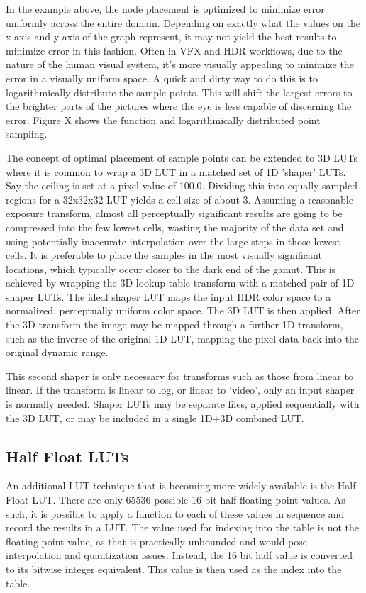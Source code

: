 In the example above, the node placement is optimized to minimize error uniformly across the entire domain. Depending on exactly what the values on the x-axis and y-axis of the graph represent, it may not yield the best results to minimize error in this fashion.  Often in VFX and HDR workflows, due to the nature of the human visual system, it's more visually appealing to minimize the error in a visually uniform space. A quick and dirty way to do this is to logarithmically distribute the sample points. This will shift the largest errors to the brighter parts of the pictures where the eye is less capable of discerning the error.  Figure X shows the function and logarithmically distributed point sampling.


The concept of optimal placement of sample points can be extended to 3D LUTs where it is common to wrap a 3D LUT in a matched set of 1D 'shaper' LUTs.  Say the ceiling is set at a pixel value of 100.0. Dividing this into equally sampled regions for a 32x32x32 LUT yields a cell size of about 3. Assuming a reasonable exposure transform, almost all perceptually significant results are going to be compressed into the few lowest cells, wasting the majority of the data set and using potentially inaccurate interpolation over the large steps in those lowest cells. It is preferable to place the samples in the most visually significant locations, which typically occur closer to the dark end of the gamut. This is achieved by wrapping the 3D lookup-table transform with a matched pair of 1D shaper LUTs. The ideal shaper LUT maps the input HDR color space to a normalized, perceptually uniform color space. The 3D LUT is then applied. After the 3D transform the image may be mapped through a further 1D transform, such as the inverse of the original 1D LUT, mapping the pixel data back into the original dynamic range.

This second shaper is only necessary for transforms such as those from linear to linear. If the transform is linear to log, or linear to `video', only an input shaper is normally needed. Shaper LUTs may be separate files, applied sequentially with the 3D LUT, or may be included in a single 1D+3D combined LUT.

\subsection{Half Float LUTs}%
\label{subsec:half-float-luts}

An additional LUT technique that is becoming more widely available is the Half Float LUT. There are only 65536 possible 16 bit half floating-point values. As such, it is possible to apply a function to each of these values in sequence and record the results in a LUT. The value used for indexing into the table is not the floating-point value, as that is practically unbounded and would pose interpolation and quantization issues. Instead, the 16 bit half value is converted to its bitwise integer equivalent. This value is then used as the index into the table.

